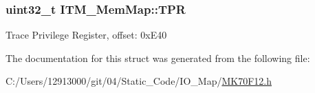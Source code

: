 \subsubsection[{T\+P\+R}]{\setlength{\rightskip}{0pt plus 5cm}uint32\+\_\+t I\+T\+M\+\_\+\+Mem\+Map\+::\+T\+P\+R}\label{struct_i_t_m___mem_map_a24ac79f5d070330282c6c0feae3cbcc1}
Trace Privilege Register, offset\+: 0x\+E40 

The documentation for this struct was generated from the following file\+:\begin{DoxyCompactItemize}
\item 
C\+:/\+Users/12913000/git/04/\+Static\+\_\+\+Code/\+I\+O\+\_\+\+Map/\hyperlink{_m_k70_f12_8h}{M\+K70\+F12.\+h}\end{DoxyCompactItemize}
